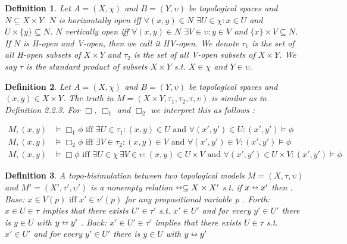 \documentclass[12pt, a4paper]{scrartcl}
\newtheorem{definition}{Definition}[subsection]
\begin{document}
\begin{definition}
    Let $A = (X, \chi)$ and $B =(Y, \upsilon)$ be topological spaces and $N \subseteq X \times Y $. \newline \newline
    $N$ is horizontally open iff  $\forall (x,y) \in N $ $\exists U \in \chi : x \in U $ and $ U \times \{ y \} \subseteq N$. \newline
    $N$ vertically open iff $\forall (x,y) \in N$ $\exists V \in \upsilon : y \in V$ and  $ \{ x \} \times V \subseteq N$. \newline \newline
    If $N$ is H-open and V-open, then we call it HV-open. \newline
    We denote $\tau_1$ is the set of all H-open subsets of $X \times Y$ and $\tau_2$ is the set of all V-open subsets of $X\times Y$. We say $\tau$ is the standard product of subsets $X \times Y$ s.t. $X \in \chi$ and $Y \in \upsilon$.
        
\end{definition}

\begin{definition}
    Let $A = (X, \chi)$ and $B =(Y, \upsilon)$ be topological spaces and $(x,y) \in X \times Y$. The truth in $M = (X\times Y, \tau_1,\tau_2,\tau, \upsilon)$ is similar as in Definition 2.2.3.
    For $\Box$, $\Box_1$ and $\Box_2$ we interpret this as follows : 
    
    \begin{align*}
        M,(x,y) &\vDash \Box_1 \phi \mbox{ iff } \exists U \in \tau_1 : (x,y) \in U \mbox{ and } \forall(x',y') \in U : (x',y') \vDash \phi \\
        M,(x,y) &\vDash \Box_2 \phi \mbox{ iff } \exists V \in \tau_2 : (x,y) \in V \mbox{ and } \forall(x',y') \in V : (x',y') \vDash \phi \\
        M,(x,y) &\vDash \Box \phi \mbox{ iff } \exists U \in \chi \, \exists V \in \upsilon: (x,y) \in U \times V \mbox{ and } \forall(x',y') \in U \times V : (x',y') \vDash \phi
    \end{align*}

\end{definition}

\begin{definition}
    A topo-bisimulation between two topological models $M = (X,\tau, \upsilon)$ and $M' = (X', \tau', \upsilon')$ is a nonempty relation $\leftrightarroweq \subseteq X \times X'$ s.t. if $x \leftrightarroweq x'$ then \newline 
    . Base: $x \in V(p) \mbox{ iff } x' \in v'(p)$ for any propositional variable p . Forth: $x \in U \in \tau$ implies that there exists $U' \in \tau'$ s.t. $x' \in U'$ and for every $y' \in U'$ there is $y \in U$ with $y \leftrightarroweq y'$ . Back: $x' \in U' \in \tau'$ implies that there exists $U \in \tau$ s.t. $x' \in U'$ and for every $y' \in U'$ there is $y \in U$ with $y \leftrightarroweq y'$

\end{definition}
\end{document}
